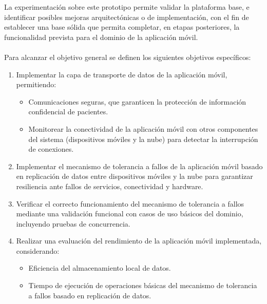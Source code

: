 La experimentación sobre este prototipo permite validar la plataforma base, e identificar posibles mejoras arquitectónicas o de implementación, con el fin de establecer una base sólida que permita completar, en etapas posteriores, la funcionalidad prevista para el dominio de la aplicación móvil.
\\\\
Para alcanzar el objetivo general se definen los siguientes objetivos específicos:
\begin{enumerate}
    \item Implementar la capa de transporte de datos de la aplicación móvil, permitiendo:
    \begin{itemize}
        \item Comunicaciones seguras, que garanticen la protección de información confidencial de pacientes. 
        \item Monitorear la conectividad de la aplicación móvil con otros componentes del sistema (dispositivos móviles y la nube) para detectar la interrupción de conexiones.
    \end{itemize}
        

    \item Implementar el mecanismo de tolerancia a fallos de la aplicación móvil basado en replicación de datos entre dispositivos móviles y la nube para garantizar resiliencia ante fallos de servicios, conectividad y hardware.

    \item Verificar el correcto funcionamiento del mecanismo de tolerancia a fallos mediante una validación funcional con casos de uso básicos del dominio, incluyendo pruebas de concurrencia.
    
    \item Realizar una evaluación del rendimiento de la aplicación móvil implementada, considerando:
    \begin{itemize}
        \item Eficiencia del almacenamiento local de datos.
        \item Tiempo de ejecución de operaciones básicas del mecanismo de tolerancia a fallos basado en replicación de datos.
    \end{itemize}

    
\end{enumerate}


